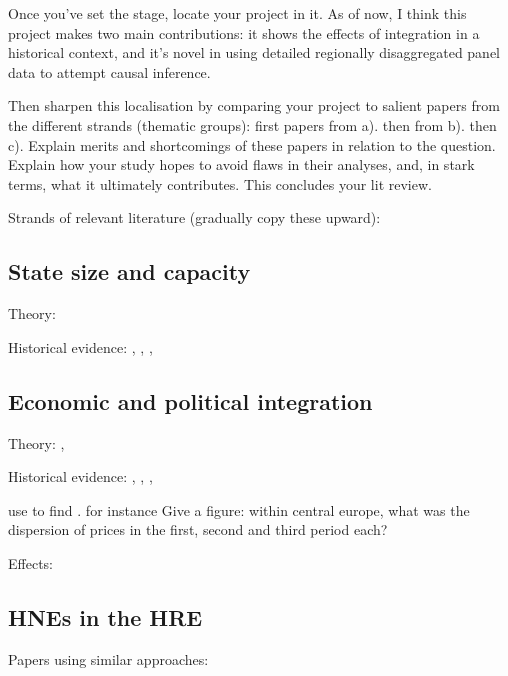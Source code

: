 \documentclass{article}
\begin{document}
Once you've set the stage, locate your project in it.
As of now, I think this project makes two main contributions: it shows the effects of integration in a historical context, and it's novel in using detailed regionally disaggregated panel data to attempt causal inference.

Then sharpen this localisation by comparing your project to salient papers from the different strands (thematic groups): first papers from a). then from b). then c). Explain merits and shortcomings of these papers in relation to the question. Explain how your study hopes to avoid flaws in their analyses, and, in stark terms, what it ultimately contributes. This concludes your lit review.

Strands of relevant literature (gradually copy these upward): 


\subsection{State size and capacity}

Theory: \cite{as1997}

Historical evidence: \cite{cervellati2022}, \cite{koyama2017}, \cite{schoenholzer2018}, \cite{sng2014}


\subsection{Economic and political integration}

Theory: \cite{sapir2011}, \cite{asw2000}

Historical evidence: \cite{chilosi2013}, \cite{kindleberger1975}, \cite{wolf2009}, \cite{chen2004}

\cite{chilosi2013} use  to find . for instance Give a figure: within central europe, what was the dispersion of prices in the first, second and third period each?

Effects: \cite{campos2019}


\subsection{HNEs in the HRE}

Papers using similar approaches: \cite{cantoni2011}
\end{document}
